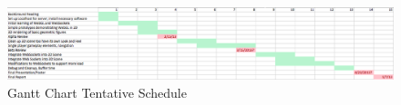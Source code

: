 \documentclass{acmsiggraph}
\begin{document}


\nocite{*}
\begin{figure}[ht!]
\centering
\includegraphics[width=7.5in]{chen_gianni_gantt.eps}
\caption{Gantt Chart Tentative Schedule}
\end{figure}
\end{document}
